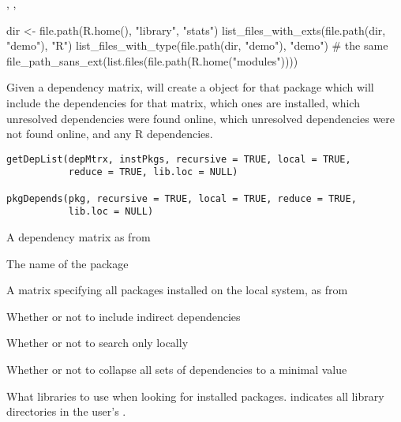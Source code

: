 %
\begin{SeeAlso}\relax
{},
,
\end{SeeAlso}
%
\begin{Examples}
\begin{ExampleCode}

dir <- file.path(R.home(), "library", "stats")
list_files_with_exts(file.path(dir, "demo"), "R")
list_files_with_type(file.path(dir, "demo"), "demo") # the same
file_path_sans_ext(list.files(file.path(R.home("modules"))))
\end{ExampleCode}
\end{Examples}
%
\begin{Description}\relax
Given a dependency matrix, will create a  object for that
package which will include the dependencies for that matrix, which
ones are installed, which unresolved dependencies were found online,
which unresolved dependencies were not found online, and any R dependencies.
\end{Description}
%
\begin{Usage}
\begin{verbatim}
getDepList(depMtrx, instPkgs, recursive = TRUE, local = TRUE,
           reduce = TRUE, lib.loc = NULL)

pkgDepends(pkg, recursive = TRUE, local = TRUE, reduce = TRUE,
           lib.loc = NULL)
\end{verbatim}
\end{Usage}
%
\begin{Arguments}
\begin{ldescription}
\item[\code{depMtrx}] A dependency matrix as from 
\item[\code{pkg}] The name of the package
\item[\code{instPkgs}] A matrix specifying all packages installed on the
local system, as from 
\item[\code{recursive}] Whether or not to include indirect dependencies
\item[\code{local}] Whether or not to search only locally
\item[\code{reduce}] Whether or not to collapse all sets of dependencies to a
minimal value
\item[\code{lib.loc}] What libraries to use when looking for installed
packages.   indicates all library directories in the
user's .
\end{ldescription}
\end{Arguments}
